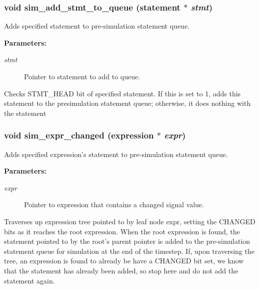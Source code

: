 \subsubsection{\setlength{\rightskip}{0pt plus 5cm}void sim\_\-add\_\-stmt\_\-to\_\-queue ({\bf statement} $\ast$ {\em stmt})}\label{sim_8c_a6}


Adds specified statement to pre-simulation statement queue.

\begin{Desc}
\item[{\bf Parameters: }]\par
\begin{description}
\item[
{\em stmt}]Pointer to statement to add to queue.

\end{description}
\end{Desc}
Checks STMT\_\-HEAD bit of specified statement. If this is set to 1, adds this statement to the presimulation statement queue; otherwise, it does nothing with the statement 
\subsubsection{\setlength{\rightskip}{0pt plus 5cm}void sim\_\-expr\_\-changed ({\bf expression} $\ast$ {\em expr})}\label{sim_8c_a5}


Adds specified expression's statement to pre-simulation statement queue.

\begin{Desc}
\item[{\bf Parameters: }]\par
\begin{description}
\item[
{\em expr}]Pointer to expression that contains a changed signal value.

\end{description}
\end{Desc}
Traverses up expression tree pointed to by leaf node expr, setting the CHANGED bits as it reaches the root expression. When the root expression is found, the statement pointed to by the root's parent pointer is added to the pre-simulation statement queue for simulation at the end of the timestep. If, upon traversing the tree, an expression is found to already be have a CHANGED bit set, we know that the statement has already been added, so stop here and do not add the statement again. 
